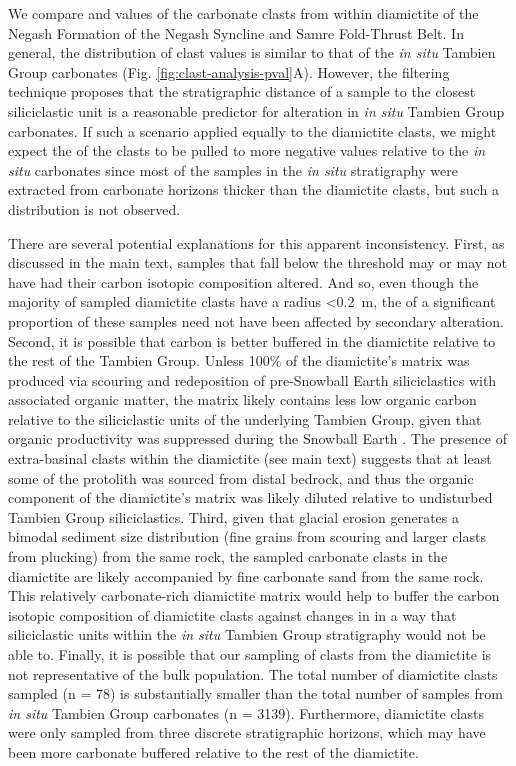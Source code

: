 We compare \dC and \dO values of the carbonate clasts from within diamictite of the Negash Formation of the Negash Syncline and Samre Fold-Thrust Belt. In general, the distribution of clast \dC values is similar to that of the \textit{in situ} Tambien Group carbonates (Fig. \ref{fig:clast-analysis-pval}A). However, the filtering technique proposes that the stratigraphic distance of a sample to the closest siliciclastic unit is a reasonable predictor for \dC alteration in \textit{in situ} Tambien Group carbonates. If such a scenario applied equally to the diamictite clasts, we might expect the \dC of the clasts to be pulled to more negative values relative to the \textit{in situ} carbonates since most of the samples in the \textit{in situ} stratigraphy were extracted from carbonate horizons thicker than the diamictite clasts, but such a distribution is not observed.

There are several potential explanations for this apparent inconsistency. First, as discussed in the main text, samples that fall below the threshold \dsil may or may not have had their carbon isotopic composition altered. And so, even though the majority of sampled diamictite clasts have a radius \textless0.2~m, the \dC of a significant proportion of these samples need not have been affected by secondary alteration. Second, it is possible that carbon is better buffered in the diamictite relative to the rest of the Tambien Group. Unless 100\% of the diamictite's matrix was produced via scouring and redeposition of pre-Snowball Earth siliciclastics with associated organic matter, the matrix likely contains less low \dC organic carbon relative to the siliciclastic units of the underlying Tambien Group, given that organic productivity was suppressed during the Snowball Earth \citep{Hoffman2017a}. The presence of extra-basinal clasts within the diamictite (see main text) suggests that at least some of the protolith was sourced from distal bedrock, and thus the organic component of the diamictite's matrix was likely diluted relative to undisturbed Tambien Group siliciclastics. Third, given that glacial erosion generates a bimodal sediment size distribution (fine grains from scouring and larger clasts from plucking) from the same rock, the sampled carbonate clasts in the diamictite are likely accompanied by fine carbonate sand from the same rock. This relatively carbonate-rich diamictite matrix would help to buffer the carbon isotopic composition of diamictite clasts against changes in \dC in a way that siliciclastic units within the \textit{in situ} Tambien Group stratigraphy would not be able to. Finally, it is possible that our sampling of clasts from the diamictite is not representative of the bulk population. The total number of diamictite clasts sampled (n = 78) is substantially smaller than the total number of samples from \textit{in situ} Tambien Group carbonates (n = 3139). Furthermore, diamictite clasts were only sampled from three discrete stratigraphic horizons, which may have been more carbonate buffered relative to the rest of the diamictite.

